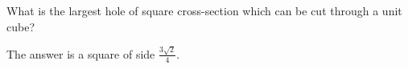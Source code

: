  What is the largest hole of square cross-section which can be 
cut through a unit cube?
\par
The answer is a square of side $ \frac{3 \sqrt{2}}{4} . $
